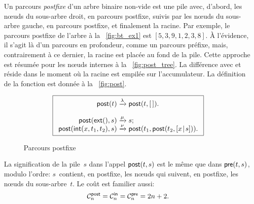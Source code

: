 Un parcours \emph{postfixe} d'un arbre
binaire non-vide est une pile avec, d'abord, les n{\oe}uds du
sous-arbre droit, en parcours postfixe, suivis par les n{\oe}uds du
sous-arbre gauche, en parcours postfixe, et finalement la racine. Par
exemple, le parcours postfixe de l'arbre à la \fig~\vref{fig:bt_ex1}
est \([5,3,9,1,2,3,8]\). À l'évidence, il s'agit là d'un parcours en
profondeur, comme un
parcours préfixe, mais, contrairement à ce dernier, la racine est
placée au fond de la pile. Cette approche est résumée pour les
n{\oe}uds internes à la \fig~\vref{fig:post_tree}. La différence avec
 et 
réside dans le moment où la racine est empilée sur l'accumulateur. La
définition de la fonction est donnée à la \fig~\vref{fig:post}.
\begin{figure}
\begin{equation*}
\boxed{
\begin{array}{r@{\;}c@{\;}l}
\fun{post}(t) & \xrightarrow{\lambda} & \fun{post}(t,\el).\\
\\
\fun{post}(\fun{ext}(),s) & \xrightarrow{\smash{\mu}} & s;\\
\fun{post}(\fun{int}(x,t_1,t_2),s)
  & \xrightarrow{\smash{\nu}}
  & \fun{post}(t_1,\fun{post}(t_2,\cons{x}{s})).
\end{array}}
\end{equation*}
\caption{Parcours postfixe\label{fig:post}}
\end{figure}
La signification de la pile~\(s\) dans l'appel
\(\textsf{post}(t,s)\)
est le même que dans \(\textsf{pre}(t,s)\), modulo l'ordre:
\(s\)~contient, en postfixe, les n{\oe}uds qui suivent, en postfixe,
les n{\oe}uds du sous-arbre~\(t\). Le coût est familier aussi:
\begin{equation*}
  \C{\fun{post}}{n} = \C{\fun{in}}{n} = \C{\fun{pre}}{n} = 2n +
  2.\index{post@$\C{\fun{post}}{n}$}
\end{equation*}

